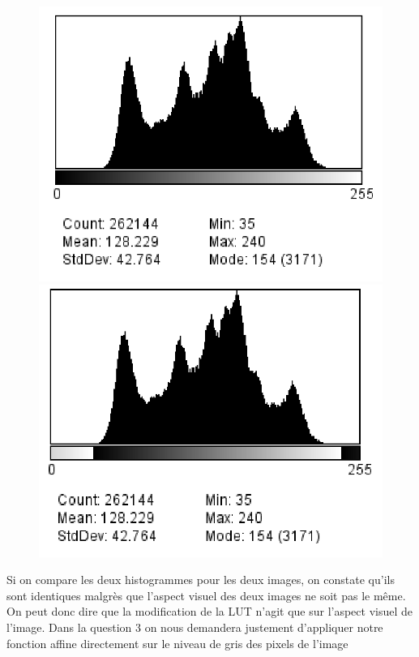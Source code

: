 \documentclass[a4paper,12pt]{report}
\begin{document}
\begin{figure}[!ht]
	\center
	\includegraphics[scale=0.4]{image/histo_base.png}
	\includegraphics[scale=0.4]{image/histo_correction_affine.png}
\end{figure}

Si on compare les deux histogrammes pour les deux images, on constate qu'ils sont identiques malgrès que l'aspect visuel des deux images ne soit pas le même.
On peut donc dire que la modification de la LUT n'agit que sur l'aspect visuel de l'image. Dans la question 3 on nous demandera justement d'appliquer notre fonction affine directement sur le niveau de gris des pixels de l'image
	
\end{document}
